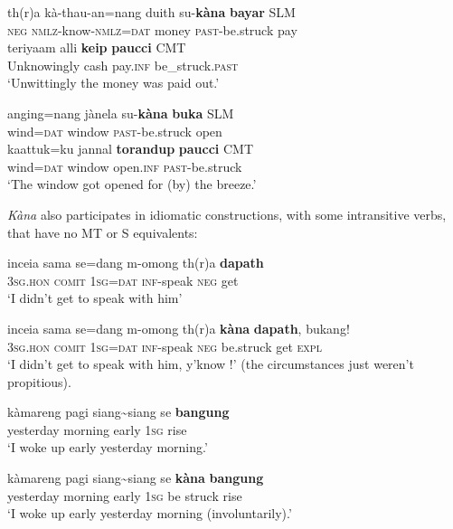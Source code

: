 \ea\label{jaffar:ex:41}
\ea
\gll th(r)a kà-thau-an=nang duith su-\textbf{kàna} \textbf{bayar}  SLM \\
 \textsc{neg}  \textsc{nmlz}-know-\textsc{nmlz}=\textsc{dat}  money \textsc{past}-be.struck pay\\
\ex%
\gll teriyaam{\E} {\textesh}alli \textbf{ke{\textrtailt}{\textrtailt}ip} \textbf{pa{\textrtailt}{\textrtailt}ucci}  CMT \\
Unknowingly cash pay.\textsc{inf} be_struck.\textsc{past} \\
`Unwittingly the money was paid out.'
\z
\z


\ea\label{jaffar:ex:43}
\ea
\gll anging=nang jànela su-\textbf{kàna} \textbf{buka}  SLM \\
 wind=\textsc{dat}  window \textsc{past}-be.struck open\\
 \ex \label{jaffar:ex:44}
\gll kaattuk=ku jannal \textbf{torandup} \textbf{pa{\textrtailt}{\textrtailt}ucci} CMT \\
   wind=\textsc{dat}  window open.\textsc{inf} \textsc{past}-be.struck \\
 `The window got opened for (by) the breeze.' 
\z
\z

\textit{Kàna} also participates in idiomatic constructions, with some intransitive verbs, that have no MT or S equivalents:

\ea\label{jaffar:ex:45}
\gll inceia sama se=dang m-omong th(r)a \textbf{dapath} \\
 3\textsc{sg}.\textsc{hon} \textsc{comit} 1\textsc{sg}=\textsc{dat}  \textsc{inf}-speak \textsc{neg} get\\
 `I didn't get to speak with him' 
\z

\ea\label{jaffar:ex:46}
\gll inceia sama se=dang m-omong th(r)a \textbf{kàna} \textbf{dapath}, bukang!\\
 3\textsc{sg}.\textsc{hon} \textsc{comit} 1\textsc{sg}=\textsc{dat}  \textsc{inf}-speak \textsc{neg} be.struck get \textsc{expl} \\
 `I didn't get to speak with him, y'know !' (the circumstances just weren't propitious).
\z

\ea\label{jaffar:ex:47}
\gll kàmareng pagi siang\~{}siang se \textbf{bangung} \\
 yesterday morning early 1\textsc{sg} rise\\
 `I woke up early yesterday morning.'
\z


\ea\label{jaffar:ex:48}
\gll kàmareng pagi siang\~{}siang se \textbf{kàna} \textbf{bangung} \\
 yesterday morning early 1\textsc{sg} be struck rise\\
 `I woke up early yesterday morning (involuntarily).'
\z

